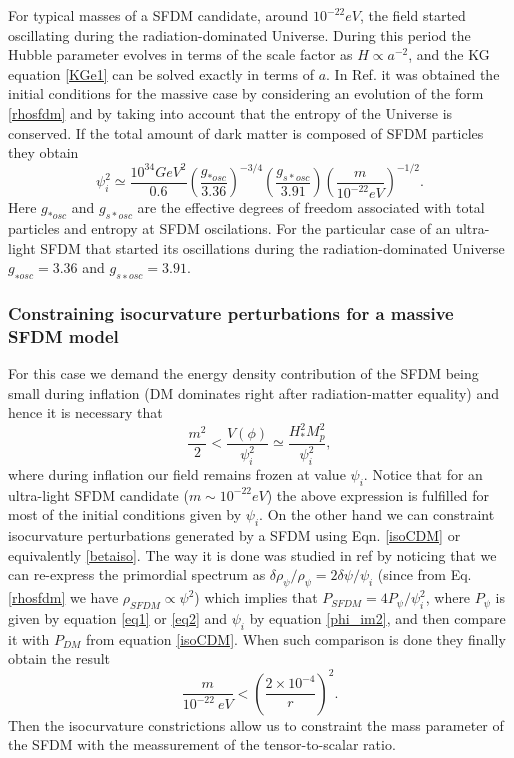\documentclass[amssymb,twocolumn,prd,nofootinbib,showpacs]{revtex4-1}
\begin{document}
For typical masses of a SFDM candidate, around $10^{-22} eV$, the field started oscillating during the radiation-dominated Universe. During this period the Hubble parameter evolves in terms of the scale factor as $H\propto a^{-2}$, and the KG equation \eqref{KGe1} can be solved exactly in terms of $a$. In Ref. \cite{SFrev2} it was obtained the initial conditions for the massive case by considering an evolution of the form \eqref{rhosfdm} and by taking into account that the entropy of the Universe is conserved. If the total amount of dark matter is composed of SFDM particles they obtain
\begin{equation}\label{phi_im2}
\psi_i^2\simeq\frac{10^{34}GeV^2}{0.6}\left(\frac{g_{*osc}}{3.36}\right)^{-3/4}\left(\frac{g_{s*osc}}{3.91}\right)\left(\frac{m}{10^{-22}eV}\right)^{-1/2}.
\end{equation}
%
Here $g_{*osc}$ and $g_{s*osc}$ are the effective degrees of freedom associated with total particles and entropy at SFDM oscilations. For the particular case of an ultra-light SFDM that started its oscillations during the radiation-dominated Universe $g_{∗osc}= 3.36$ and $g_{s∗osc}= 3.91$.

\subsubsection{Constraining isocurvature perturbations for a massive SFDM model}

For this case we demand the energy density contribution of the SFDM being small during inflation (DM dominates right after radiation-matter equality) 
and hence it is necessary that 
%
\begin{equation}
\frac{m^2}{2} < \frac{V(\phi)}{\psi_i^2}\simeq \frac{H^2_{*}M_p^2}{\psi_i^2},
\end{equation}
%
where during inflation our field remains frozen  at value $\psi_i$. 
Notice that for an ultra-light SFDM candidate  ($m\sim 10^{-22}eV$) the above expression is fulfilled for most of the 
initial conditions given by $\psi_i$. 
%
On the other hand we can constraint isocurvature perturbations generated by a SFDM using Eqn. \eqref{isoCDM} or equivalently \eqref{betaiso}. The way it is done was studied in ref \cite{SFrev2} by noticing  that  we  can  re-express  the  primordial spectrum as $\delta\rho_\psi/\rho_\psi = 2\delta\psi/\psi_i$ (since  from  Eq.   \eqref{rhosfdm} we have $\rho_{SFDM}\propto \psi^2$) which implies that $P_{SFDM}=4P_{\psi}/\psi_i^2$, where $P_\psi$ is given by equation \eqref{eq1} or  \eqref{eq2} and $\psi_i$ by equation \eqref{phi_im2}, and then compare it with $P_{DM}$ from equation \eqref{isoCDM}.  When such comparison is done they finally obtain the result
\begin{equation}\label{constm}
\frac{m}{10^{-22}\ eV}<\left(\frac{2\times 10^{-4}}{r}\right)^2.
\end{equation}
Then the isocurvature constrictions allow us to constraint the mass parameter of the SFDM with the meassurement of the tensor-to-scalar ratio.
\end{document}
